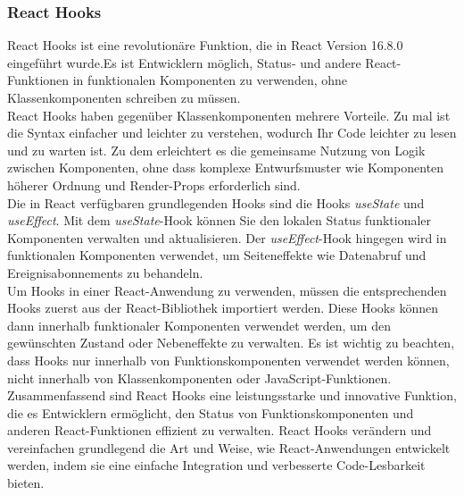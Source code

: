 \subsubsection{React Hooks}
React Hooks ist eine revolutionäre Funktion, die in React Version 16.8.0 eingeführt wurde.Es ist  Entwicklern möglich, Status- und andere React-Funktionen in funktionalen Komponenten zu verwenden, ohne Klassenkomponenten schreiben zu müssen.\\
React Hooks haben gegenüber Klassenkomponenten mehrere Vorteile. Zu mal ist die Syntax einfacher und leichter  zu verstehen, wodurch Ihr Code leichter zu lesen und zu warten ist. Zu dem erleichtert es die gemeinsame Nutzung von Logik zwischen Komponenten, ohne dass komplexe Entwurfsmuster wie Komponenten höherer Ordnung und Render-Props erforderlich sind.\\
Die in React verfügbaren grundlegenden Hooks sind die Hooks \emph{useState} und \emph{useEffect}. Mit dem \emph{useState}-Hook können Sie den lokalen Status funktionaler Komponenten verwalten und  aktualisieren. Der \emph{useEffect}-Hook hingegen wird  in funktionalen Komponenten verwendet, um Seiteneffekte wie Datenabruf und Ereignisabonnements zu behandeln.\\  
Um Hooks in einer React-Anwendung zu verwenden, müssen   die entsprechenden Hooks zuerst aus der React-Bibliothek importiert werden. Diese Hooks können dann innerhalb funktionaler Komponenten verwendet werden, um den gewünschten Zustand oder Nebeneffekte zu verwalten. Es ist wichtig zu beachten, dass Hooks nur innerhalb von Funktionskomponenten verwendet werden können, nicht innerhalb von Klassenkomponenten oder JavaScript-Funktionen. \cite{react-hooks}\\
Zusammenfassend sind React Hooks eine leistungsstarke und innovative Funktion, die es Entwicklern ermöglicht, den Status von Funktionskomponenten und anderen React-Funktionen effizient zu verwalten.  React Hooks verändern und vereinfachen grundlegend die Art und Weise, wie React-Anwendungen entwickelt werden, indem sie eine einfache Integration und verbesserte Code-Lesbarkeit bieten.

